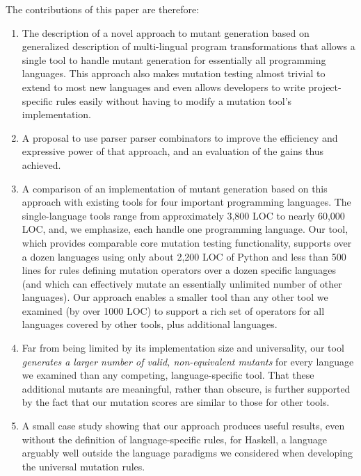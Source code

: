 \documentclass[acmsmall,screen,review,anonymous]{acmart}
\begin{document}
The contributions of this paper are therefore:

\begin{enumerate}
  \item The description of a novel approach to mutant generation
    based on generalized description of multi-lingual program transformations
    that allows a single tool to handle mutant generation for
    essentially all programming languages.  This approach also makes
    mutation testing almost trivial to extend to most new languages and even allows
    developers to write project-specific rules easily without
    having to modify a mutation tool's implementation.

          \item A proposal to use parser parser combinators to improve the
      efficiency and expressive power of that approach, and an
      evaluation of the gains thus achieved.

    
      \item A comparison of an implementation of mutant generation
       based on this approach with existing tools for four important
       programming languages.  The single-language tools range from
       approximately 3,800 LOC to nearly 60,000 LOC, and, we emphasize, each handle
       one programming language.  Our tool, which provides comparable
       core mutation testing functionality, supports over a dozen
       languages using only about 2,200 LOC of Python and less than 500
       lines for rules defining mutation operators over a dozen
       specific languages (and which can effectively mutate an
       essentially unlimited number of other languages).  Our
       approach enables a smaller tool than any other tool
       we examined (by over 1000 LOC) to support a rich set of
       operators for all languages covered by other tools, plus additional languages.
       \item Far from being limited by its implementation size and
         universality, our tool \emph{generates a larger number of valid,
         non-equivalent mutants} for every language we examined than
         any competing, language-specific tool.  That these additional
         mutants
         are meaningful, rather than obscure, is further supported by
         the fact that our mutation scores are similar to those for
         other tools.

       \item A small case study showing that our approach produces
         useful results, even without the definition of
         language-specific rules, for Haskell, a language arguably
         well outside the language paradigms we considered when
         developing the universal mutation rules.

\end{enumerate}
\end{document}
